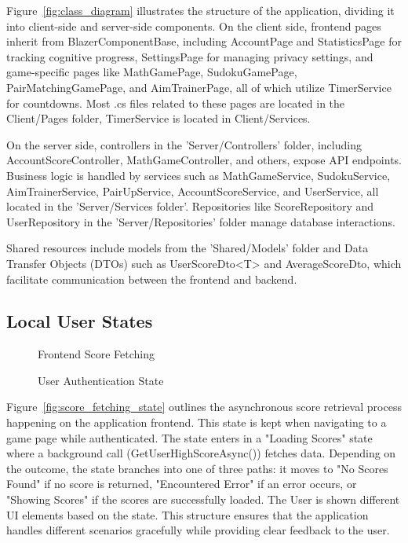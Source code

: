 \documentclass[11pt,a4paper]{article}
\newcommand{\inputdiagram}[1]{}
\newcommand{\textwidthdiagram}[2][1]{%
  \resizebox{#1\textwidth}{!}{\inputdiagram{#2}}%
}
\begin{document}
Figure~\ref{fig:class_diagram} illustrates the structure of the application, dividing it into client-side and server-side components. On the client side, frontend pages inherit from BlazerComponentBase, including AccountPage and StatisticsPage for tracking cognitive progress, SettingsPage for managing privacy settings, and game-specific pages like MathGamePage, SudokuGamePage, PairMatchingGamePage, and AimTrainerPage, all of which utilize TimerService for countdowns. Most .cs files related to these pages are located in the Client/Pages folder, TimerService is located in Client/Services.

On the server side, controllers in the 'Server/Controllers' folder, including AccountScoreController, MathGameController, and others, expose API endpoints. Business logic is handled by services such as MathGameService, SudokuService, AimTrainerService, PairUpService, AccountScoreService, and UserService, all located in the 'Server/Services folder'. Repositories like ScoreRepository and UserRepository in the 'Server/Repositories' folder manage database interactions.

Shared resources include models from the 'Shared/Models' folder and Data Transfer Objects (DTOs) such as UserScoreDto<T> and AverageScoreDto, which facilitate communication between the frontend and backend.

\subsection{Local User States}
\begin{figure}[H]
    \centering
    \begin{minipage}[b]{0.59\textwidth}
        \centering
        \textwidthdiagram{score_fetching_state.tex}
        \caption{Frontend Score Fetching}
        \label{fig:score_fetching_state}
    \end{minipage}
    \hfil
    \begin{minipage}[b]{0.4\textwidth}
        \centering
        \textwidthdiagram{user_authentication_state.tex}
        \caption{User Authentication State}
        \label{fig:user_authentication_state}
    \end{minipage}
\end{figure}

Figure~\ref{fig:score_fetching_state} outlines the asynchronous score
retrieval process happening on the application frontend. This state is kept
when navigating to a game page while authenticated. The state enters in a
"Loading Scores" state where a background call (GetUserHighScoreAsync())
fetches data. Depending on the outcome, the state branches into one
of three paths: it moves to "No Scores Found" if no score is returned,
"Encountered Error" if an error occurs, or "Showing Scores" if the scores
are successfully loaded. The User is shown different UI elements based on
the state. This structure ensures that the application handles different
scenarios gracefully while providing clear feedback to the user.
\end{document}
